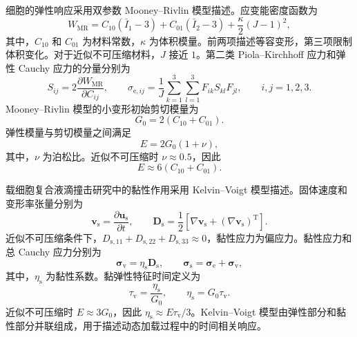 细胞的弹性响应采用双参数 Mooney--Rivlin 模型描述。应变能密度函数为
\begin{equation}
W_{\mathrm{MR}}
=
C_{10}\left(\bar I_1-3\right)
+
C_{01}\left(\bar I_2-3\right)
+
\frac{\kappa}{2}\left(J-1\right)^2,
\label{eq:ch2_mooney_rivlin}
\end{equation}
其中，$C_{10}$ 和 $C_{01}$ 为材料常数，$\kappa$ 为体积模量。前两项描述等容变形，第三项限制体积变化。对于近似不可压缩材料，$J$ 接近 $1$\cite{mooney1940large,rivlin1948large}。第二类 Piola--Kirchhoff 应力和弹性 Cauchy 应力的分量分别为
\begin{equation}
S_{ij}
=
2\frac{\partial W_{\mathrm{MR}}}{\partial C_{ij}},
\qquad
\sigma_{\mathrm e,ij}
=
\frac{1}{J}
\sum_{k=1}^{3}\sum_{l=1}^{3}
F_{ik}S_{kl}F_{jl},
\qquad i,j=1,2,3.
\label{eq:ch2_hyperelastic_stress}
\end{equation}
Mooney--Rivlin 模型的小变形初始剪切模量为
\begin{equation}
G_0=2\left(C_{10}+C_{01}\right).
\label{eq:ch2_initial_shear_modulus}
\end{equation}
弹性模量与剪切模量之间满足
\begin{equation}
E=2G_0(1+\nu),
\label{eq:ch2_elastic_shear_relation}
\end{equation}
其中，$\nu$ 为泊松比。近似不可压缩时 $\nu\approx0.5$，因此
\begin{equation}
E\approx6\left(C_{10}+C_{01}\right).
\label{eq:ch2_mr_modulus_relation}
\end{equation}

载细胞复合液滴撞击研究中的黏性作用采用 Kelvin--Voigt 模型描述。固体速度和变形率张量分别为
\begin{equation}
\boldsymbol{v}_{\mathrm s}
=
\frac{\partial\boldsymbol{u}_{\mathrm s}}{\partial t},
\qquad
\boldsymbol{D}_{\mathrm s}
=
\frac{1}{2}
\left[
\nabla\boldsymbol{v}_{\mathrm s}
+
\left(\nabla\boldsymbol{v}_{\mathrm s}\right)^{\mathrm T}
\right].
\label{eq:ch2_solid_rate}
\end{equation}
近似不可压缩条件下，$D_{\mathrm s,11}+D_{\mathrm s,22}+D_{\mathrm s,33}\approx0$，黏性应力为偏应力。黏性应力和总 Cauchy 应力分别为
\begin{equation}
\boldsymbol{\sigma}_{\mathrm v}
=
\eta_{\mathrm s}\boldsymbol{D}_{\mathrm s},
\qquad
\boldsymbol{\sigma}_{\mathrm s}
=
\boldsymbol{\sigma}_{\mathrm e}
+
\boldsymbol{\sigma}_{\mathrm v},
\label{eq:ch2_kelvin_voigt_3d}
\end{equation}
其中，$\eta_{\mathrm s}$ 为黏性系数。黏弹性特征时间定义为
\begin{equation}
\tau_{\mathrm v}
=
\frac{\eta_{\mathrm s}}{G_0},
\qquad
\eta_{\mathrm s}=G_0\tau_{\mathrm v}.
\label{eq:ch2_kelvin_voigt_time}
\end{equation}
近似不可压缩时 $E\approx3G_0$，因此 $\eta_{\mathrm s}\approx E\tau_{\mathrm v}/3$。Kelvin--Voigt 模型由弹性部分和黏性部分并联组成，用于描述动态加载过程中的时间相关响应\cite{christensen1982theory,lakes1998viscoelastic}。

